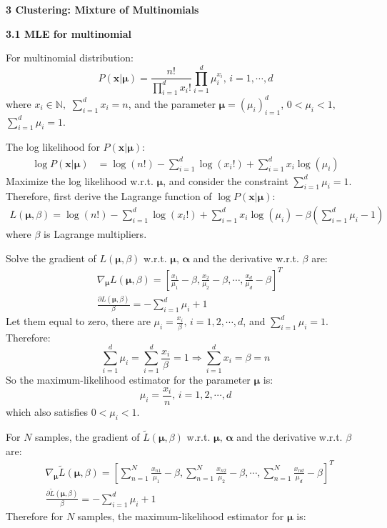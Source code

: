 \documentclass[12pt]{article}
\begin{document}
\bigskip
{\large \bf 3 Clustering: Mixture of Multinomials}
\par
\bigskip
{\bf 3.1 MLE for multinomial}
\par
For multinomial distribution:
$$P(\bm{x}|\bm{\mu})=\frac{n!}{\prod_{i=1}^d x_i!}\prod_{i=1}^d \mu_i^{x_i},\,i=1,\cdots,d$$
where $x_i\in\mathbb{N},$ $\sum_{i=1}^d x_i=n$, and the parameter $\bm{\mu}=(\mu_i)_{i=1}^d$, $0<\mu_i<1,$ $\sum_{i=1}^d\mu_i=1$.
\par
The log likelihood for $P(\bm{x}|\bm{\mu})$:
\begin{align*}
\log P(\bm{x}|\bm{\mu})&=\log(n!)-\sum_{i=1}^d\log(x_i!)+\sum_{i=1}^d x_i\log(\mu_i)
\end{align*}
Maximize the log likelihood w.r.t. $\bm{\mu}$, and consider the constraint $\sum_{i=1}^d\mu_i=1$. Therefore, first derive the Lagrange function of $\log P(\bm{x}|\bm{\mu})$:
\begin{align*}
L(\bm{\mu},\beta)=\log(n!)-\sum_{i=1}^d\log(x_i!)+\sum_{i=1}^d x_i\log(\mu_i)-\beta\left(\sum_{i=1}^d\mu_i-1\right)
\end{align*}
where $\beta$ is Lagrange multipliers.
\par
Solve the gradient of $L(\bm{\mu},\beta)$ w.r.t. $\bm{\mu},\,\bm{\alpha}$ and the derivative w.r.t. $\beta$ are:
\begin{align*}
&\nabla_{\bm{\mu}}L(\bm{\mu},\beta)=\left[\frac{x_1}{\mu_1}-\beta,\frac{x_2}{\mu_2}-\beta,\cdots,\frac{x_d}{\mu_d}-\beta\right]^T\\
&\frac{\partial L(\bm{\mu},\beta)}{\beta}=-\sum_{i=1}^d\mu_i+1
\end{align*}
Let them equal to zero, there are $\mu_i=\frac{x_i}{\beta},\,i=1,2,\cdots,d$, and $\sum_{i=1}^d\mu_i=1$. Therefore:
$$\sum_{i=1}^d\mu_i=\sum_{i=1}^d\frac{x_i}{\beta}=1\Rightarrow\sum_{i=1}^d x_i=\beta=n$$
So the maximum-likelihood estimator for the parameter $\bm{\mu}$ is:
$$\mu_i=\frac{x_i}{n},\,i=1,2,\cdots,d$$
which also satisfies $0<\mu_i<1$.
\par
For $N$ samples, the gradient of $\tilde{L}(\bm{\mu},\beta)$ w.r.t. $\bm{\mu},\,\bm{\alpha}$ and the derivative w.r.t. $\beta$ are:
\begin{align*}
&\nabla_{\bm{\mu}}\tilde{L}(\bm{\mu},\beta)=\left[\sum_{n=1}^N\frac{x_{n1}}{\mu_1}-\beta,\sum_{n=1}^N\frac{x_{n2}}{\mu_2}-\beta,\cdots,\sum_{n=1}^N\frac{x_{nd}}{\mu_d}-\beta\right]^T\\
&\frac{\partial\tilde{L}(\bm{\mu},\beta)}{\beta}=-\sum_{i=1}^d\mu_i+1
\end{align*}
Therefore for $N$ samples, the maximum-likelihood estimator for $\bm{\mu}$ is:
\end{document}
